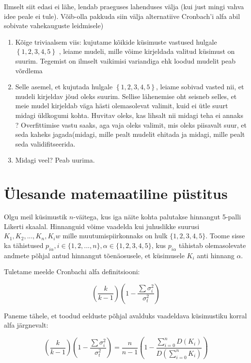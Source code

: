 \documentclass[a4paper]{article}
\numberwithin{equation}{section}
\theoremstyle{definition}
\begin{document}
{\color{cyan} Ilmselt siit edasi ei lähe, lendab praeguses lahenduses välja (kui just mingi vahva idee peale ei tule). Võib-olla pakkuda siin välja alternatiive Cronbach'i alfa abil sobivate vahekauguste leidmisele) }
\begin{enumerate}
\item Kõige triviaalsem viis: kujutame kõikide k\"usimuste vastused hulgale $\left\lbrace 1,2,3,4,5 \right\rbrace$ , leiame mudeli, mille võime kirjeldada valitud k\"usimust on suurim. Tegemist on ilmselt vaikimisi variandiga ehk loodud mudelit peab võrdlema 
\item Selle asemel, et kujutada hulgale $\left\lbrace 1,2,3,4,5 \right\rbrace$, leiame sobivad vasted nii, et mudeli kirjeldav jõud oleks suurim. Sellise lähenemise oht seisneb selles, et meie mudel kirjeldab väga hästi olemasolevat valimit, kuid ei \"utle suurt midagi \"uldkogumi kohta. {\color{blue} Huvitav oleks, kas lihsalt nii midagi teha ei annaks ? Overfittimise vastu saaks, aga vaja oleks valimit, mis oleks piisavalt suur, et seda kaheks jagada(midagi, mille pealt mudelit ehitada ja midagi, mille pealt seda validifitseerida}. 
\item {\color{blue} Midagi veel? Peab uurima.}
\end{enumerate}

\section{\"Ulesande matemaatiline p\"ustitus}

Olgu meil k\"usimustik $n$-väitega, kus iga näite kohta palutakse hinnangut 5-palli Likerti skaalal. Hinnanguid võime vaadelda kui juhuslikke suurusi $K_1,K_2,...,K_n, K_iw$ mille muutumispiirkonnaks on hulk $\{1,2,3,4,5\}$. Toome sisse ka tähistused $p_{i \alpha}, i \in \{1,2,...,n\}, \alpha \in \{1,2,3,4,5\}$, kus $p_{i \alpha}$ tähistab olemasolevate andmete põhjal antud hinnangut tõenäosusele, et k\"usimusele $K_i$ anti hinnang $\alpha$. 

Tuletame meelde Cronbachi alfa definitsiooni:


\begin{equation*}
(\frac{k}{k-1})( 1 - \frac{\sum \sigma_i^2}{\sigma_t^2})
\end{equation*}

Paneme tähele, et toodud eelduste põhjal avalduks vaadeldava k\"usimustiku korral alfa järgnevalt:

 
\begin{equation*}
(\frac{k}{k-1})( 1 - \frac{\sum \sigma_i^2}{\sigma_t^2}) = \frac{n}{n-1}\left(1 - \frac
{\sum \limits_{i=0}^n D(K_i)}{D(\sum \limits_{i=0}^n K_i)}\right)
\end{equation*}
\end{document}
